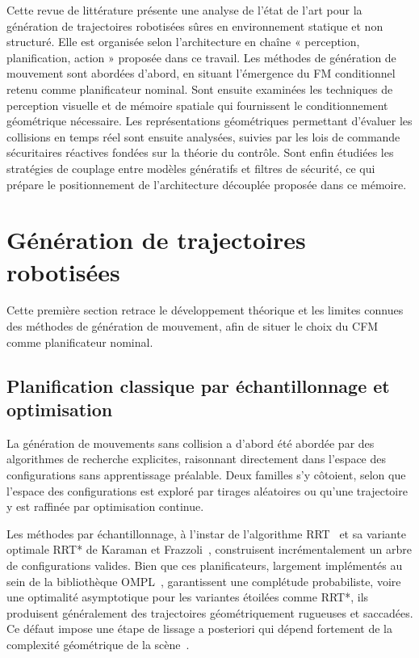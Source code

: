 \label{sec:RevLitt}

Cette revue de littérature présente une analyse de l'état de l'art pour la génération de trajectoires robotisées sûres en environnement statique et non structuré. Elle est organisée selon l'architecture en chaîne « perception, planification, action » proposée dans ce travail. Les méthodes de génération de mouvement sont abordées d'abord, en situant l'émergence du \ac{FM} conditionnel retenu comme planificateur nominal. Sont ensuite examinées les techniques de perception visuelle et de mémoire spatiale qui fournissent le conditionnement géométrique nécessaire. Les représentations géométriques permettant d'évaluer les collisions en temps réel sont ensuite analysées, suivies par les lois de commande sécuritaires réactives fondées sur la théorie du contrôle. Sont enfin étudiées les stratégies de couplage entre modèles génératifs et filtres de sécurité, ce qui prépare le positionnement de l'architecture découplée proposée dans ce mémoire.

\section{Génération de trajectoires robotisées}

Cette première section retrace le développement théorique et les limites connues des méthodes de génération de mouvement, afin de situer le choix du \ac{CFM} comme planificateur nominal.

\subsection{Planification classique par échantillonnage et optimisation}
La génération de mouvements sans collision a d'abord été abordée par des algorithmes de recherche explicites, raisonnant directement dans l'espace des configurations sans apprentissage préalable. Deux familles s'y côtoient, selon que l'espace des configurations est exploré par tirages aléatoires ou qu'une trajectoire y est raffinée par optimisation continue.

Les méthodes par échantillonnage, à l'instar de l'algorithme \ac{RRT}~\cite{Kuffner2000Rrt} et sa variante optimale \ac{RRT}* de Karaman et Frazzoli~\cite{Karaman2011Sampling}, construisent incrémentalement un arbre de configurations valides. Bien que ces planificateurs, largement implémentés au sein de la bibliothèque \ac{OMPL}~\cite{Sucan2012Ompl}, garantissent une complétude probabiliste, voire une optimalité asymptotique pour les variantes étoilées comme \ac{RRT}*, ils produisent généralement des trajectoires géométriquement rugueuses et saccadées. Ce défaut impose une étape de lissage a posteriori qui dépend fortement de la complexité géométrique de la scène~\cite{Liu2021Motion}.

